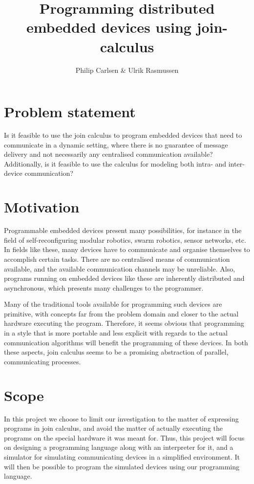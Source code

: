 \documentclass[a4paper, 11pt, oneside, report]{memoir}
\title{Programming distributed embedded devices using join-calculus}
\author{Philip Carlsen \& Ulrik Rasmussen}
\begin{document}
\maketitle

\section*{Problem statement}

Is it feasible to use the join calculus\cite{join-calculus} to program embedded
devices that need to communicate in a dynamic setting, where there is no
guarantee of message delivery and not necessarily any centralised communication
available? Additionally, is it feasible to use the calculus for modeling both
intra- and inter-device communication?

\section*{Motivation}

Programmable embedded devices present many possibilities, for instance in the
field of self-reconfiguring modular robotics, swarm robotics, sensor networks,
etc. In fields like these, many devices have to communicate and organise
themselves to accomplish certain tasks.  There are no centralised means of
communication available, and the available communication channels may be
unreliable. Also, programs running on embedded devices like these are
inherently distributed and asynchronous, which presents many challenges to the
programmer.

Many of the traditional tools available for programming such devices are
primitive, with concepts far from the problem domain and closer to the actual
hardware executing the program. Therefore, it seems obvious that programming in
a style that is more portable and less explicit with regards to the actual
communication algorithms will benefit the programming of these devices. In both
these aspects, join calculus seems to be a promising abstraction of parallel,
communicating processes.

\section*{Scope}

In this project we choose to limit our investigation to the matter of
expressing programs in join calculus, and avoid the matter of actually
executing the programs on the special hardware it was meant for.
Thus, this project will focus on designing a programming language along with an
interpreter for it, and a simulator for simulating communicating devices in a
simplified environment. It will then be possible to program the simulated
devices using our programming language.
\end{document}
